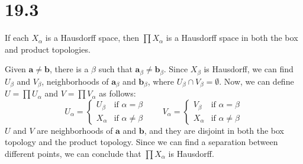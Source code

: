 \documentclass{article}
\begin{document}
\section*{19.3}
\begin{tcolorbox}[title=Statement]
    If each $X_\alpha$ is a Hausdorff space, then $\prod X_\alpha$ is a Hausdorff space in both the box and product topologies.
\end{tcolorbox}
\noindent
Given $\bm{a} \neq \bm{b}$, there is a $\beta$ such that $\bm{a}_\beta \neq \bm{b}_\beta$. Since $X_\beta$ is Hausdorff, we can find $U_\beta$ and $V_\beta$, neighborhoods of $\bm{a}_\beta$ and $\bm{b}_\beta$, where $U_\beta \cap V_\beta = \emptyset$. Now, we can define $U = \prod{U_\alpha}$ and $V = \prod{V_\alpha}$ as follows:
\begin{equation*}
    U_\alpha = \begin{cases}
        U_\beta  & \text{if } \alpha = \beta \\
        X_\alpha & \text{if } \alpha \neq \beta
    \end{cases}
    \qquad
    V_\alpha = \begin{cases}
        V_\beta  & \text{if } \alpha = \beta \\
        X_\alpha & \text{if } \alpha \neq \beta
    \end{cases}
\end{equation*}
$U$ and $V$ are neighborhoods of $\bm{a}$ and $\bm{b}$, and they are disjoint in both the box topology and the product topology. Since we can find a separation between different points, we can conclude that $\prod X_\alpha$ is Hausdorff.
\end{document}
